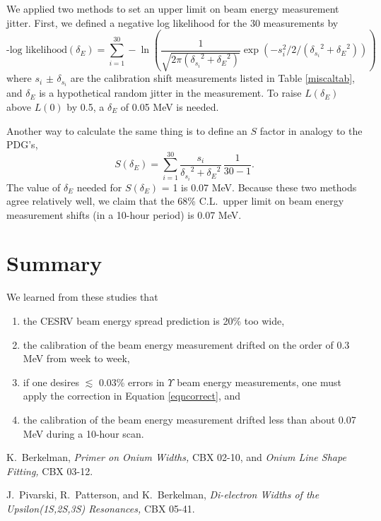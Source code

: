 \documentclass[aps,prd,preprint,superscriptaddress,tightenlines,nofootinbib,floatfix]{revtex4}
\begin{document}
We applied two methods to set an upper limit on beam energy
measurement jitter.  First, we defined a negative log likelihood for
the 30 measurements by
\begin{equation}
  \mbox{-log likelihood}(\delta_E) = \sum_{i=1}^{30} -\ln \left(\frac{1}
  {\sqrt{2\pi ({\delta_{s_i}}^2 + {\delta_E}^2)}} \exp\left(
  -s_i^2 / 2 / ({\delta_{s_i}}^2 + {\delta_E}^2) \right) \right)
\end{equation}
where $s_i$ $\pm$ $\delta_{s_i}$ are the calibration shift
measurements listed in Table \ref{miscaltab}, and $\delta_E$ is a
hypothetical random jitter in the measurement.  To raise $L(\delta_E)$
above $L(0)$ by 0.5, a $\delta_E$ of 0.05 MeV is needed.

Another way to calculate the same thing is to define an $S$ factor in
analogy to the PDG's,
\begin{equation}
  S(\delta_E) = \sum_{i=1}^{30} \frac{s_i}{{\delta_{s_i}}^2 +
  {\delta_E}^2} \, \frac{1}{30 - 1} \mbox{.}
\end{equation}
The value of $\delta_E$ needed for $S(\delta_E)$ = 1 is 0.07 MeV.
Because these two methods agree relatively well, we claim that the
68\% C.L.\ upper limit on beam energy measurement shifts (in a 10-hour
period) is 0.07 MeV.

\section{Summary}

We learned from these studies that
\begin{enumerate}
  \item the CESRV beam energy spread prediction is 20\% too wide,

  \item the calibration of the beam energy measurement drifted on the
    order of 0.3 MeV from week to week,

  \item if one desires $\lesssim$ 0.03\% errors in $\Upsilon$ beam
    energy measurements, one must apply the correction in Equation
    \ref{eqncorrect}, and

  \item the calibration of the beam energy measurement drifted less
    than about 0.07 MeV during a 10-hour scan.
\end{enumerate}

\begin{thebibliography}{99}


 K.~Berkelman, {\it Primer on Onium Widths,} CBX 02-10, and {\it Onium Line Shape Fitting,} CBX 03-12.

 J.~Pivarski, R.~Patterson, and K.~Berkelman, {\it Di-electron Widths of the Upsilon(1S,2S,3S) Resonances,} CBX 05-41.

\end{thebibliography}
\end{document}
